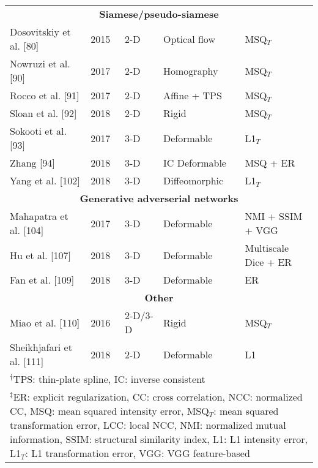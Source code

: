 \begin{table}[!htb]
\begin{tabular*}{\textwidth}{l@{\extracolsep{\fill}}l@{\extracolsep{\fill}}l@{\extracolsep{\fill}}ll}
\midrule
\multicolumn{5}{c}{\textbf{Siamese/pseudo-siamese}}
  \vspace{0.25cm} \\
  Dosovitskiy et al. [80] & 2015 & 2-D & Optical flow & MSQ$_T$ \\ %
  Nowruzi et al. [90] & 2017 & 2-D & Homography & MSQ$_T$ \\
  Rocco et al. [91] & 2017 & 2-D & Affine + TPS & MSQ$_T$ \\
  Sloan et al. [92] & 2018 & 2-D & Rigid & MSQ$_T$ \\  %
  Sokooti et al. [93] & 2017 & 3-D & Deformable & L1$_T$ \\
  Zhang [94] & 2018 & 3-D & IC Deformable & MSQ + ER \\
  Yang et al. [102] & 2018 & 3-D & Diffeomorphic & L1$_T$ \\  %
\midrule
\multicolumn{5}{c}{\textbf{Generative adverserial networks}}
  \vspace{0.25cm} \\
  Mahapatra et al. [104] & 2017 & 3-D & Deformable & NMI + SSIM + VGG \\
  Hu et al. [107] & 2018 & 3-D & Deformable & Multiscale Dice + ER \\
  Fan et al. [109] & 2018 & 3-D & Deformable & ER \\
\midrule
\multicolumn{5}{c}{\textbf{Other}}
  \vspace{0.25cm} \\
  Miao et al. [110] & 2016 & 2-D/3-D & Rigid & MSQ$_T$ \\
  Sheikhjafari et al. [111] & 2018 & 2-D & Deformable & L1 \\
\bottomrule
\multicolumn{5}{l}{
  \begin{minipage}[t]{0.9\columnwidth}%
    \footnotesize{$^\dagger$TPS: thin-plate spline, IC: inverse consistent}
  \end{minipage}
  } \\
\multicolumn{5}{l}{
  \begin{minipage}[t]{0.92\columnwidth}%
    \footnotesize{$^\ddagger$ER:  explicit regularization,
      CC: cross correlation, NCC: normalized CC, MSQ: mean squared intensity error,
      MSQ$_T$: mean squared transformation error, LCC:  local NCC,
      NMI:  normalized mutual information, SSIM:  structural similarity index,
      L1:  L1 intensity error,
      L1$_T$: L1 transformation error, VGG: VGG feature-based}
  \end{minipage}
  }
\end{tabular*}
\end{table}


